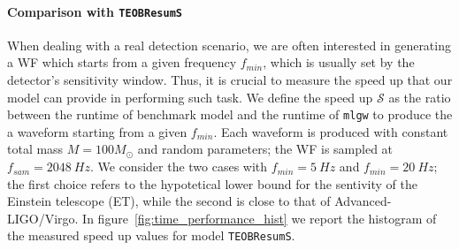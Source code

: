 \paragraph{Comparison with \texttt{TEOBResumS}}
When dealing with a real detection scenario, we are often interested in generating a WF which starts from a given frequency $f_{min}$, which is usually set by the detector's sensitivity window. Thus, it is crucial to measure the speed up that our model can provide in performing such task.
We define the speed up $\mathcal{S}$ as the ratio between the runtime of benchmark model and the runtime of \texttt{mlgw} to produce the a waveform starting from a given $f_{min}$. Each waveform is produced with constant total mass $M = 100 M_{\odot}$ and random parameters; the WF is sampled at $f_{sam} = \SI{2048}{Hz}$.
We consider the two cases with $f_{min} = \SI{5}{Hz}$ and $f_{min} = \SI{20}{Hz}$; the first choice refers to the hypotetical lower bound for the sentivity of the Einstein telescope (ET), while the second is close to that of Advanced-LIGO/Virgo.
In figure~\ref{fig:time_performance_hist} we report the histogram of the measured speed up values for model \texttt{TEOBResumS}.
  
